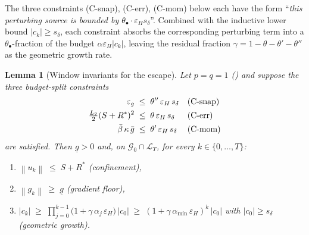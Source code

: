 \documentclass[11pt,a4paper]{article}
\theoremstyle{plain}
\newtheorem{lemma}{Lemma}
\theoremstyle{definition}
\newcommand{\norm}[1]{\left\|#1\right\|}
\newcommand{\eps}{\varepsilon}
\newcommand{\epsg}{\eps_{g}}
\newcommand{\epsH}{\eps_{H}}
\newcommand{\Ltwo}{L_{2}}
\newcommand{\sdel}{s_{\delta}}
\newcommand{\glow}{\underline{g}}
\newcommand{\amin}{\alpha_{\min}}
\begin{document}
The three constraints (C-snap), (C-err), (C-mom) below each have the form
``\emph{this perturbing source is bounded by
$\theta_{\bullet}\cdot\epsH\sdel$}''. Combined with the inductive lower
bound $|c_{k}|\ge\sdel$, each constraint absorbs the corresponding
perturbing term into a $\theta_{\bullet}$-fraction of the budget
$\alpha\epsH|c_{k}|$, leaving the residual fraction
$\gamma = 1-\theta-\theta'-\theta''$ as the geometric growth rate.

\begin{lemma}[Window invariants for the escape]\label{lem:induction}
Let $p=q=1$ () and suppose the three budget-split constraints
\begin{align}
\epsg                                &\;\le\; \theta''\,\epsH\,\sdel &&\textnormal{(C-snap)}\label{eq:snap-split}\\
\tfrac{\Ltwo}{2}(S+R^{*})^{2}         &\;\le\; \theta\,\epsH\,\sdel   &&\textnormal{(C-err)}\label{eq:err-split}\\
\bar\beta\,\kappa\,\bar g        &\;\le\; \theta'\,\epsH\,\sdel  &&\textnormal{(C-mom)}\label{eq:mom-split}
\end{align}
are satisfied. Then $\glow > 0$ and, on $\mathcal{G}_{0}\cap\mathcal{L}_{T}$,
for every $k\in\{0,\dots,T\}$:
\begin{enumerate}[label=\textnormal{(\roman*)}]
\item $\norm{u_{k}} \;\le\; S+R^{*}$ \hfill \textnormal{(confinement)},
\item $\norm{g_{k}} \;\ge\; \glow$ \hfill \textnormal{(gradient floor)},
\item $|c_{k}| \;\ge\; \prod_{j=0}^{k-1}\bigl(1+\gamma\,\alpha_{j}\,\epsH\bigr)\,|c_{0}|
\;\ge\; (1+\gamma\,\amin\,\epsH)^{k}\,|c_{0}|$
with $|c_{0}|\ge\sdel$ \hfill \textnormal{(geometric growth)}.
\end{enumerate}
\end{lemma}
\end{document}
